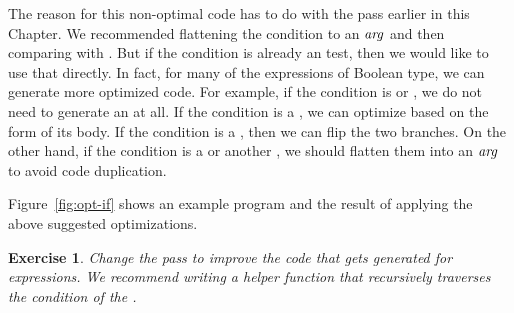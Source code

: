 \documentclass[11pt]{book}
\newtheorem{exercise}[theorem]{Exercise}
\begin{document}
The reason for this non-optimal code has to do with the 
pass earlier in this Chapter. We recommended flattening the condition
to an $\mathit{arg}$ and then comparing with . But if the condition
is already an  test, then we would like to use that
directly. In fact, for many of the expressions of Boolean type, we can
generate more optimized code. For example, if the condition is
 or , we do not need to generate an  at
all. If the condition is a , we can optimize based on the
form of its body. If the condition is a , then we can flip
the two branches. 
%
%
On the other hand, if the condition is a 
or another , we should flatten them into an $\mathit{arg}$ to avoid
code duplication.

Figure~\ref{fig:opt-if} shows an example program and the result of
applying the above suggested optimizations.

\begin{exercise}\normalfont
  Change the  pass to improve the code that gets
  generated for  expressions. We recommend writing a helper
  function that recursively traverses the condition of the .
\end{exercise}
\end{document}
